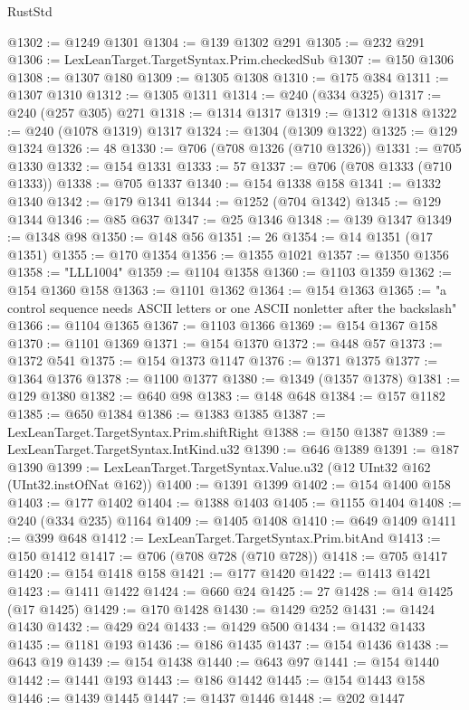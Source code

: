 \begin{lexlean}{RustStd}
\begin{coremodule}
@1302 := @1249 @1301
@1304 := @139 @1302 @291
@1305 := @232 @291
@1306 := LexLeanTarget.TargetSyntax.Prim.checkedSub
@1307 := @150 @1306
@1308 := @1307 @180
@1309 := @1305 @1308
@1310 := @175 @384
@1311 := @1307 @1310
@1312 := @1305 @1311
@1314 := @240 (@334 @325)
@1317 := @240 (@257 @305) @271
@1318 := @1314 @1317
@1319 := @1312 @1318
@1322 := @240 (@1078 @1319) @1317
@1324 := @1304 (@1309 @1322)
@1325 := @129 @1324
@1326 := 48
@1330 := @706 (@708 @1326 (@710 @1326))
@1331 := @705 @1330
@1332 := @154 @1331
@1333 := 57
@1337 := @706 (@708 @1333 (@710 @1333))
@1338 := @705 @1337
@1340 := @154 @1338 @158
@1341 := @1332 @1340
@1342 := @179 @1341
@1344 := @1252 (@704 @1342)
@1345 := @129 @1344
@1346 := @85 @637
@1347 := @25 @1346
@1348 := @139 @1347
@1349 := @1348 @98
@1350 := @148 @56
@1351 := 26
@1354 := @14 @1351 (@17 @1351)
@1355 := @170 @1354
@1356 := @1355 @1021
@1357 := @1350 @1356
@1358 := "LLL1004"
@1359 := @1104 @1358
@1360 := @1103 @1359
@1362 := @154 @1360 @158
@1363 := @1101 @1362
@1364 := @154 @1363
@1365 := "a control sequence needs ASCII letters or one ASCII nonletter after the backslash"
@1366 := @1104 @1365
@1367 := @1103 @1366
@1369 := @154 @1367 @158
@1370 := @1101 @1369
@1371 := @154 @1370
@1372 := @448 @57
@1373 := @1372 @541
@1375 := @154 @1373 @1147
@1376 := @1371 @1375
@1377 := @1364 @1376
@1378 := @1100 @1377
@1380 := @1349 (@1357 @1378)
@1381 := @129 @1380
@1382 := @640 @98
@1383 := @148 @648
@1384 := @157 @1182
@1385 := @650 @1384
@1386 := @1383 @1385
@1387 := LexLeanTarget.TargetSyntax.Prim.shiftRight
@1388 := @150 @1387
@1389 := LexLeanTarget.TargetSyntax.IntKind.u32
@1390 := @646 @1389
@1391 := @187 @1390
@1399 := LexLeanTarget.TargetSyntax.Value.u32 (@12 UInt32 @162 (UInt32.instOfNat @162))
@1400 := @1391 @1399
@1402 := @154 @1400 @158
@1403 := @177 @1402
@1404 := @1388 @1403
@1405 := @1155 @1404
@1408 := @240 (@334 @235) @1164
@1409 := @1405 @1408
@1410 := @649 @1409
@1411 := @399 @648
@1412 := LexLeanTarget.TargetSyntax.Prim.bitAnd
@1413 := @150 @1412
@1417 := @706 (@708 @728 (@710 @728))
@1418 := @705 @1417
@1420 := @154 @1418 @158
@1421 := @177 @1420
@1422 := @1413 @1421
@1423 := @1411 @1422
@1424 := @660 @24
@1425 := 27
@1428 := @14 @1425 (@17 @1425)
@1429 := @170 @1428
@1430 := @1429 @252
@1431 := @1424 @1430
@1432 := @429 @24
@1433 := @1429 @500
@1434 := @1432 @1433
@1435 := @1181 @193
@1436 := @186 @1435
@1437 := @154 @1436
@1438 := @643 @19
@1439 := @154 @1438
@1440 := @643 @97
@1441 := @154 @1440
@1442 := @1441 @193
@1443 := @186 @1442
@1445 := @154 @1443 @158
@1446 := @1439 @1445
@1447 := @1437 @1446
@1448 := @202 @1447

\end{coremodule}
\end{lexlean}

